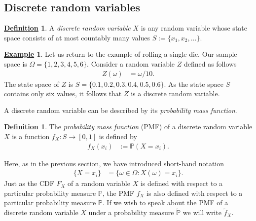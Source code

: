 \documentclass[12pt]{book}
\numberwithin{equation}{chapter}
\theoremstyle{plain}
\numberwithin{theorem}{section}
\theoremstyle{definition}
\newtheorem{definition}[theorem]{\underline{Definition}}
\newtheorem{example}[theorem]{\underline{Example}}
\numberwithin{exercise}{chapter}
\newcommand{\<}{\langle}
\renewcommand{\>}{\rangle}
\renewcommand{\(}{\left(}
\renewcommand{\)}{\right)}
\renewcommand{\[}{\left[}
\renewcommand{\]}{\right]}
\newcommand\Pb{\mathds{P}}
\newcommand\om{\omega}
\newcommand\Om{\Omega}
\newcommand\Pbt{\widetilde{\Pb}}
\newcommand\ft{\widetilde{f}}
\theoremstyle{definition}
\numberwithin{question}{section}
\begin{document}

\subsection{Discrete random variables}
\label{sec:disc.rv}

\begin{definition}
\label{def:disc.rv}
A \textit{discrete random variable} $X$ is any random variable whose state space consists of at most countably many values $S := \{ x_1, x_2, \ldots \}$.
\end{definition}

\begin{example}
Let us return to the example of rolling a single die.  Our sample space is $\Om = \{1,2,3,4,5,6\}$.
Consider a random variable $Z$ defined as follows
\begin{align}
Z(\om)
	&=	\om/10 .
\end{align}
The state space of $Z$ is $S = \{0.1, 0.2, 0.3, 0.4, 0.5, 0.6\}$.  As the state space $S$ contains only six values, it follows that $Z$ is a discrete random variable.
\end{example}

\noindent
A discrete random variable can be described by its \textit{probability mass function}.

\begin{definition}
\label{def:pmf}
The \textit{probability mass function} (PMF) of a discrete random variable $X$ is a function $f_X : S \to [0,1]$ is defined by
\begin{align}
f_X(x_i)
	&:=	\Pb( X = x_i ) . \label{eq:pmf}
\end{align}
\end{definition}

\noindent
Here, as in the previous section, we have introduced short-hand notation
\begin{align}
\{ X = x_i\}
	&=	\{ \om \in \Om : X(\om) = x_i \} .
\end{align}
Just as the CDF $F_X$ of a random variable $X$ is defined with respect to a particular probability measure $\Pb$, the PMF $f_X$ is also defined with respect to a particular probability measure $\Pb$.  If we wish to speak about the PMF of a discrete random variable $X$ under a probability measure $\Pbt$ we will write $\ft_X$.
\end{document}
